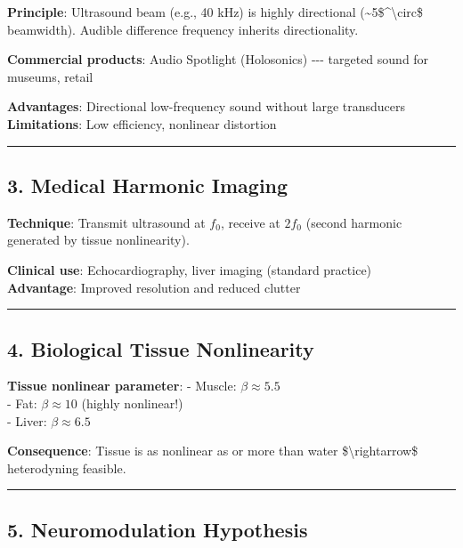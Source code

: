 \textbf{Principle}: Ultrasound beam (e.g., 40 kHz) is highly directional
(\textasciitilde5\$\^{}\textbackslash circ\$ beamwidth). Audible
difference frequency inherits directionality.

\textbf{Commercial products}: Audio Spotlight (Holosonics) -\/-\/-
targeted sound for museums, retail

\textbf{Advantages}: Directional low-frequency sound without large
transducers\\
\textbf{Limitations}: Low efficiency, nonlinear distortion

\begin{center}\rule{0.5\linewidth}{0.5pt}\end{center}

\subsection{\texorpdfstring{3. Medical Harmonic Imaging
}{3. Medical Harmonic Imaging }}\label{medical-harmonic-imaging}

\textbf{Technique}: Transmit ultrasound at \(f_0\), receive at \(2f_0\)
(second harmonic generated by tissue nonlinearity).

\textbf{Clinical use}: Echocardiography, liver imaging (standard
practice)\\
\textbf{Advantage}: Improved resolution and reduced clutter

\begin{center}\rule{0.5\linewidth}{0.5pt}\end{center}

\subsection{\texorpdfstring{4. Biological Tissue Nonlinearity
}{4. Biological Tissue Nonlinearity }}\label{biological-tissue-nonlinearity}

\textbf{Tissue nonlinear parameter}: - Muscle: \(\beta \approx 5.5\)\\
- Fat: \(\beta \approx 10\) (highly nonlinear!)\\
- Liver: \(\beta \approx 6.5\)

\textbf{Consequence}: Tissue is as nonlinear as or more than water
\$\textbackslash rightarrow\$ heterodyning feasible.

\begin{center}\rule{0.5\linewidth}{0.5pt}\end{center}

\subsection{\texorpdfstring{5. Neuromodulation Hypothesis
}{5. Neuromodulation Hypothesis }}\label{neuromodulation-hypothesis}

